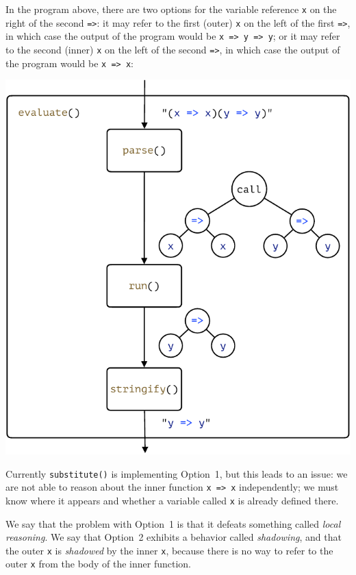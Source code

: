 \documentclass[12pt, oneside]{book}
\begin{document}
In the program above, there are two options for the variable reference \texttt{x} on the right of the second \texttt{=>}: it may refer to the first (outer) \texttt{x} on the left of the first \texttt{=>}, in which case the output of the program would be \texttt{x => y => y}; or it may refer to the second (inner) \texttt{x} on the left of the second \texttt{=>}, in which case the output of the program would be \texttt{x => x}:

\begin{center}
\includegraphics[page = 7]{images.pdf}
\end{center}

Currently \texttt{substitute()} is implementing Option~1, but this leads to an issue: we are not able to reason about the inner function \texttt{x => x} independently; we must know where it appears and whether a variable called \texttt{x} is already defined there.

\begin{mdframed}[frametitle = {Technical Terms}]
We say that the problem with Option~1 is that it defeats something called \emph{local reasoning}. We say that Option~2 exhibits a behavior called \emph{shadowing}, and that the outer \texttt{x} is \emph{shadowed} by the inner \texttt{x}, because there is no way to refer to the outer \texttt{x} from the body of the inner function.
\end{mdframed}
\end{document}
